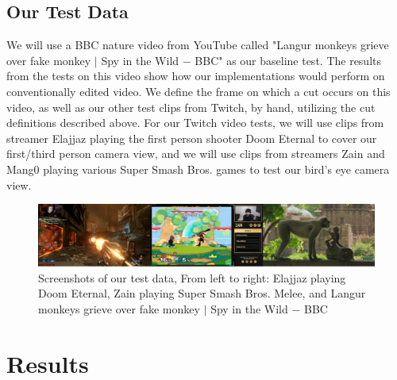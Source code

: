 \documentclass[12pt]{article}
\begin{document}
\subsection{Our Test Data}
We will use a BBC nature video from YouTube called "Langur monkeys grieve over fake monkey $|$ Spy in the Wild $-$ BBC" as our baseline test. The results from the 
tests on this video show how our implementations would perform on conventionally edited video. We define the frame on which a cut occurs on this video, as well as our 
other test clips from Twitch, by hand, utilizing the cut definitions described above. For our Twitch video tests, we will use clips from streamer Elajjaz playing the first 
person shooter Doom Eternal to cover our first/third person camera view, and we will use clips from streamers Zain and Mang0 playing various Super Smash Bros. games 
to test our bird's eye camera view.

\begin{figure}[ht]
    \centering
    \includegraphics[width=1.0\textwidth]{fig3}
    \caption{Screenshots of our test data, From left to right: Elajjaz playing Doom Eternal, Zain playing Super Smash Bros. Melee, and Langur monkeys grieve over 
    fake monkey $|$ Spy in the Wild $-$ BBC}
    \label{Screenshots of our test data}
\end{figure}

\clearpage
\section{Results}
\end{document}
